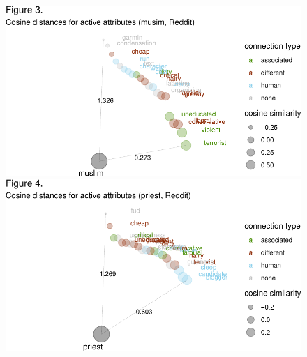 \documentclass[12pt,dvipsnames,enabledeprecatedfontcommands]{scrartcl}
\begin{document}
\begin{center}
\begin{figure}[!htb]
   
  \begin{minipage}{0.48\textwidth}

\begin{center}\includegraphics[width=1\linewidth]{abstractESSLLI1_files/figure-latex/unnamed-chunk-3-1} \end{center}
\end{minipage}
   \begin {minipage}{0.48\textwidth}

\begin{center}\includegraphics[width=1\linewidth]{abstractESSLLI1_files/figure-latex/unnamed-chunk-4-1} \end{center}
   \end{minipage}
   
   
   

\end{figure}
\end{center}
\end{document}
